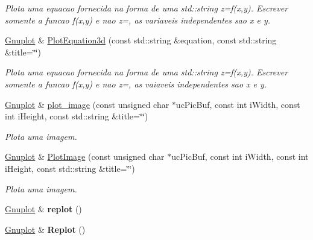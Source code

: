 \begin{DoxyCompactItemize}
\begin{DoxyCompactList}\small\item\em Plota uma equacao fornecida na forma de uma std\-::string z=f(x,y). Escrever somente a funcao f(x,y) e nao z=, as variaveis independentes sao x e y. \end{DoxyCompactList}\item 
\hypertarget{classGnuplot_a545ea6339c234d277339ab148cd11dba}{\hyperlink{classGnuplot}{Gnuplot} \& \hyperlink{classGnuplot_a545ea6339c234d277339ab148cd11dba}{Plot\-Equation3d} (const std\-::string \&equation, const std\-::string \&title=\char`\"{}\char`\"{})}\label{classGnuplot_a545ea6339c234d277339ab148cd11dba}

\begin{DoxyCompactList}\small\item\em Plota uma equacao fornecida na forma de uma std\-::string z=f(x,y). Escrever somente a funcao f(x,y) e nao z=, as vaiaveis independentes sao x e y. \end{DoxyCompactList}\item 
\hyperlink{classGnuplot}{Gnuplot} \& \hyperlink{classGnuplot_ab71117b8fa74d53ea20c313717d86b5c}{plot\-\_\-image} (const unsigned char $\ast$uc\-Pic\-Buf, const int i\-Width, const int i\-Height, const std\-::string \&title=\char`\"{}\char`\"{})
\begin{DoxyCompactList}\small\item\em Plota uma imagem. \end{DoxyCompactList}\item 
\hypertarget{classGnuplot_aeb28a013344a81314bf831e14623154e}{\hyperlink{classGnuplot}{Gnuplot} \& \hyperlink{classGnuplot_aeb28a013344a81314bf831e14623154e}{Plot\-Image} (const unsigned char $\ast$uc\-Pic\-Buf, const int i\-Width, const int i\-Height, const std\-::string \&title=\char`\"{}\char`\"{})}\label{classGnuplot_aeb28a013344a81314bf831e14623154e}

\begin{DoxyCompactList}\small\item\em Plota uma imagem. \end{DoxyCompactList}\item 
\hypertarget{classGnuplot_ae4f110479cfd8dc9b1b3d45809fb05e0}{\hyperlink{classGnuplot}{Gnuplot} \& {\bfseries replot} ()}\label{classGnuplot_ae4f110479cfd8dc9b1b3d45809fb05e0}

\item 
\hypertarget{classGnuplot_a565fb1504cd88277e3c2092ad2234234}{\hyperlink{classGnuplot}{Gnuplot} \& {\bfseries Replot} ()}\label{classGnuplot_a565fb1504cd88277e3c2092ad2234234}


\end{DoxyCompactItemize}
